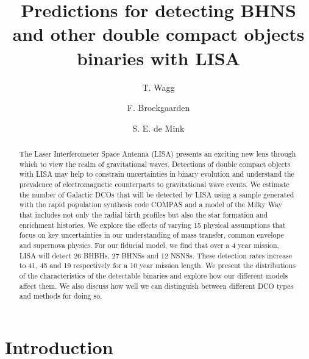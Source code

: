 \documentclass[twocolumn]{aastex63}
\begin{document}
\title{Predictions for detecting BHNS and other double compact objects binaries with LISA}


\author[0000-0001-6147-5761]{T. Wagg}

\author[0000-0002-4421-4962]{F. Broekgaarden}

\author[0000-0001-9336-2825]{S. E. de Mink}

\begin{abstract}
{The Laser Interferometer Space Antenna (LISA) presents an exciting new lens through which to view the realm of gravitational waves. Detections of double compact objects with LISA may help to constrain uncertainties in binary evolution and understand the prevalence of electromagnetic counterparts to gravitational wave events. We estimate the number of Galactic DCOs that will be detected by LISA using a sample generated with the rapid population synthesis code COMPAS and a model of the Milky Way that includes not only the radial birth profiles but also the star formation and enrichment histories. We explore the effects of varying 15 physical assumptions that focus on key uncertainties in our understanding of mass transfer, common envelope and supernova physics. For our fiducial model, we find that over a 4 year mission, LISA will detect 26 BHBHs, 27 BHNSs and 12 NSNSs. These detection rates increase to 41, 45 and 19 respectively for a 10 year mission length. We present the distributions of the characteristics of the detectable binaries and explore how our different models affect them. We also discuss how well we can distinguish between different DCO types and methods for doing so.}
\end{abstract}


\section{Introduction} \label{sec:intro}
\end{document}
